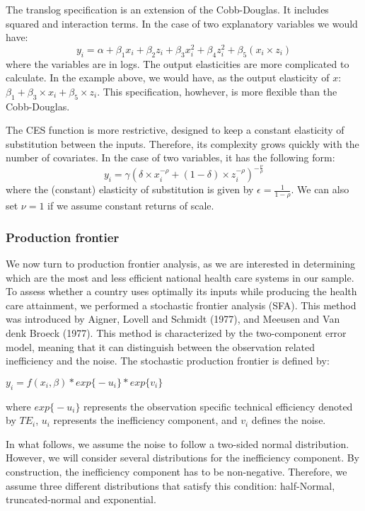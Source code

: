 \documentclass[12pt,a4paper]{article}\usepackage[]{graphicx}\usepackage[]{color}
\begin{document}
The translog specification is an extension of the Cobb-Douglas. It includes squared and interaction terms. In the case of two explanatory variables we would have:
\[ y_i = \alpha + \beta_1 x_i + \beta_2 z_i + \beta_3 x_i^2 + \beta_4 z_i^2 + \beta_5 \left(x_i \times z_i\right) \]
where the variables are in logs. The output elasticities are more complicated to calculate. In the example above, we would have, as the output elasticity of $x$: $ \beta_1 + \beta_3 \times x_i + \beta_5 \times z_i $. This specification, howhever, is more flexible than the Cobb-Douglas.

The CES function is more restrictive, designed to keep a constant elasticity of substitution between the inputs. Therefore, its complexity grows quickly with the number of covariates. In the case of two variables, it has the following form:
\[ y_i = \gamma \left( \delta \times x_i^{-\rho} + (1- \delta) \times z_i^{-\rho} \right)^{-\frac{\nu}{\rho}} \]
where the (constant) elasticity of substitution is given by $\epsilon = \frac{1}{1- \rho}$. We can also set $\nu = 1$ if we assume constant returns of scale.

\subsubsection{Production frontier}

We now turn to production frontier analysis, as we are interested in determining which are the most and less efficient national health care systems in our sample. To assess whether a country uses optimally its inputs while producing the health care attainment, we performed a stochastic frontier analysis (SFA).  This method was introduced by Aigner, Lovell and Schmidt (1977), and Meeusen and Van denk Broeck (1977). This method is characterized by the two-component error model, meaning that it can distinguish between the observation related inefficiency and the noise. The stochastic production frontier is defined by:
\begin{center} 
$y_i=f(x_i,\beta)*exp\big\{-u_i\big\}*exp\big\{v_i\big\}$
\end{center}
where $exp\big\{-u_i\big\}$ represents the observation specific technical efficiency denoted by $TE_i$, $u_i$ represents the inefficiency component, and $v_i$ defines the noise. 

In what follows, we assume the noise to follow a two-sided normal distribution. However, we will consider several distributions for the inefficiency component. By construction, the inefficiency component has to be non-negative. Therefore, we assume three different distributions that satisfy this condition: half-Normal, truncated-normal and exponential.
\end{document}
